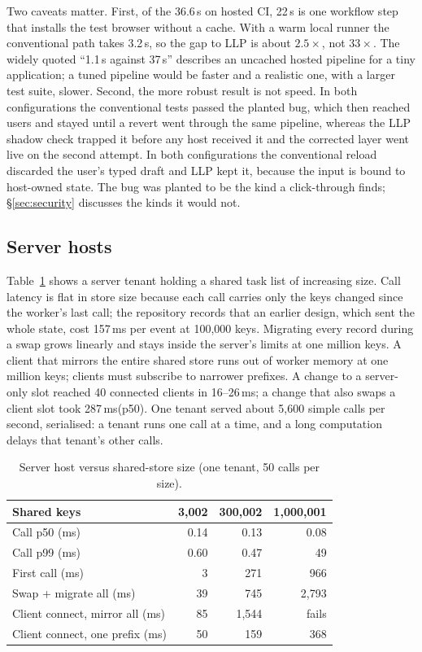 \documentclass[10pt,twocolumn]{article}
\newcommand{\ms}{\,ms\xspace}
\newcommand{\s}{\,s\xspace}
\begin{document}
Two caveats matter. First, of the 36.6\s on hosted CI, 22\s is one workflow step that installs
the test browser without a cache. With a warm local runner the conventional path takes 3.2\s, so
the gap to LLP is about $2.5\times$, not $33\times$. The widely quoted ``1.1\s against 37\s''
describes an uncached hosted pipeline for a tiny application; a tuned pipeline would be faster and
a realistic one, with a larger test suite, slower. Second, the more robust result is not speed. In
both configurations the conventional tests passed the planted bug, which then reached users and
stayed until a revert went through the same pipeline, whereas the LLP shadow check trapped it
before any host received it and the corrected layer went live on the second attempt. In both
configurations the conventional reload discarded the user's typed draft and LLP kept it, because
the input is bound to host-owned state. The bug was planted to be the kind a click-through finds;
\S\ref{sec:security} discusses the kinds it would not.

\subsection{Server hosts}

Table~\ref{tab:server} shows a server tenant holding a shared task list of increasing size. Call
latency is flat in store size because each call carries only the keys changed since the worker's
last call; the repository records that an earlier design, which sent the whole state, cost
157\ms per event at 100{,}000 keys.
Migrating every record during a swap grows linearly and stays inside the server's limits at one
million keys. A client that mirrors the entire shared store runs out of worker memory at one
million keys; clients must subscribe to narrower prefixes. A change to a server-only slot reached
40 connected clients in 16--26\ms; a change that also swaps a client slot took 287\ms (p50). One
tenant served about 5{,}600 simple calls per second, serialised: a tenant runs one call at a
time, and a long computation delays that tenant's other calls.

\begin{table}[t]
\centering\footnotesize
\begin{tabular}{@{}lrrr@{}}
\toprule
Shared keys & 3{,}002 & 300{,}002 & 1{,}000{,}001 \\
\midrule
Call p50 (ms) & 0.14 & 0.13 & 0.08 \\
Call p99 (ms) & 0.60 & 0.47 & 49 \\
First call (ms) & 3 & 271 & 966 \\
Swap + migrate all (ms) & 39 & 745 & 2{,}793 \\
Client connect, mirror all (ms) & 85 & 1{,}544 & fails \\
Client connect, one prefix (ms) & 50 & 159 & 368 \\
\bottomrule
\end{tabular}
\caption{Server host versus shared-store size (one tenant, 50 calls per size).}
\label{tab:server}
\end{table}
\end{document}

